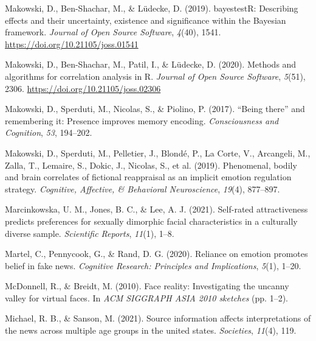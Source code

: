 \documentclass[
  man,floatsintext]{apa6}
\newlength{\cslhangindent}
\newlength{\cslentryspacingunit} %
\newenvironment{CSLReferences}[2] %
 {%
  \setlength{\parindent}{0pt}
  \ifodd #1
  \let\oldpar\par
  \def\par{\hangindent=\cslhangindent\oldpar}
  \fi
  \setlength{\parskip}{#2\cslentryspacingunit}
 }%
 {}
\begin{document}
\begin{CSLReferences}{1}{0}
\leavevmode{}%
Makowski, D., Ben-Shachar, M., \& Lüdecke, D. (2019). {bayestestR}: Describing effects and their uncertainty, existence and significance within the {Bayesian} framework. \emph{Journal of Open Source Software}, \emph{4}(40), 1541. \url{https://doi.org/10.21105/joss.01541}

\leavevmode{}%
Makowski, D., Ben-Shachar, M., Patil, I., \& Lüdecke, D. (2020). Methods and algorithms for correlation analysis in {R}. \emph{Journal of Open Source Software}, \emph{5}(51), 2306. \url{https://doi.org/10.21105/joss.02306}

\leavevmode{}%
Makowski, D., Sperduti, M., Nicolas, S., \& Piolino, P. (2017). {``Being there''} and remembering it: Presence improves memory encoding. \emph{Consciousness and Cognition}, \emph{53}, 194--202.

\leavevmode{}%
Makowski, D., Sperduti, M., Pelletier, J., Blondé, P., La Corte, V., Arcangeli, M., Zalla, T., Lemaire, S., Dokic, J., Nicolas, S., et al. (2019). Phenomenal, bodily and brain correlates of fictional reappraisal as an implicit emotion regulation strategy. \emph{Cognitive, Affective, \& Behavioral Neuroscience}, \emph{19}(4), 877--897.

\leavevmode{}%
Marcinkowska, U. M., Jones, B. C., \& Lee, A. J. (2021). Self-rated attractiveness predicts preferences for sexually dimorphic facial characteristics in a culturally diverse sample. \emph{Scientific Reports}, \emph{11}(1), 1--8.

\leavevmode{}%
Martel, C., Pennycook, G., \& Rand, D. G. (2020). Reliance on emotion promotes belief in fake news. \emph{Cognitive Research: Principles and Implications}, \emph{5}(1), 1--20.

\leavevmode{}%
McDonnell, R., \& Breidt, M. (2010). Face reality: Investigating the uncanny valley for virtual faces. In \emph{ACM SIGGRAPH ASIA 2010 sketches} (pp. 1--2).

\leavevmode{}%
Michael, R. B., \& Sanson, M. (2021). Source information affects interpretations of the news across multiple age groups in the united states. \emph{Societies}, \emph{11}(4), 119.


\end{CSLReferences}
\end{document}

